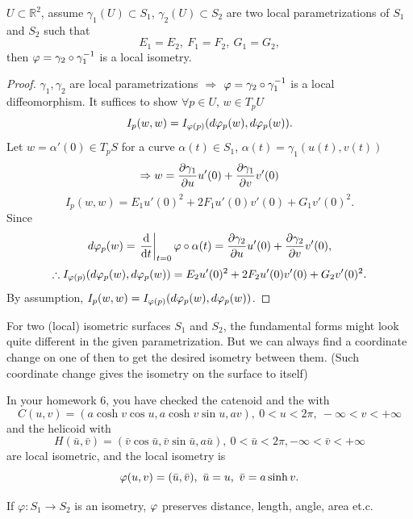 \begin{proposition}
    \(U\subset \mathbb{R}^2\), assume \(\gamma_1(U)\subset S_1\), 
    \(\gamma_2(U)\subset S_2\) are two local parametrizations 
    of \(S_1\) and \(S_2\) such that 
    \[
        E_1=E_2,~F_1=F_2,~G_1=G_2,    
    \]
    then \(\varphi=\gamma_2\circ \gamma_1^{-1}\) is a local isometry.
\end{proposition}
\begin{proof}
    \(\gamma_1,\gamma_2\) are local parametrizations \(\Rightarrow\)
    \(\varphi=\gamma_2\circ\gamma_1^{-1}\) is a local diffeomorphism. 
    It suffices to show \(\forall p\in U\), \(w\in T_p U\)
    \[
        I_p(w,w)=I_{\varphi(p)}(d\varphi_p(w),d\varphi_p(w)).    
    \]
    Let \(w=\alpha'(0)\in T_p S\) for a curve \(\alpha(t)\in S_1\),
     \(\alpha(t)=\gamma_1\left(u(t),v(t)\right)\) 
     \[\Rightarrow
     w=\pdv{\gamma_1}{u}u'(0)+\pdv{\gamma_1}{v}v'(0)\]
     \[
        I_p(w,w)=E_1u'(0)^2+2 F_1u'(0)v'(0)+G_1 v'(0)^2.   
     \]
     Since
     \[
        d\varphi_p(w)=\left.\dv{t}\right|_{t=0}\varphi\circ \alpha(t)
        =\pdv{\gamma_2}{u}u'(0)+\pdv{\gamma_2}{v}v'(0) ,
     \]
     \[
        \therefore I_{\varphi(p)}(d\varphi_p(w),d\varphi_p(w))=
        E_2 u'(0)^2+2 F_2 u'(0)v'(0)+G_2 v'(0)^2  .
     \]
    By assumption, \(I_p(w,w)=I_{\varphi(p)}(d\varphi_p(w),d\varphi_p(w))\).
\end{proof}
\begin{remark}
    For two (local) isometric surfaces \(S_1\) and \(S_2\), the 
     fundamental forms might look quite different 
    in the given parametrization. But we can always find a coordinate 
    change on one of then to get the desired isometry between them.
    (Such coordinate change gives the isometry on the surface to itself)
\end{remark}
\begin{exercise}
    In your homework 6, you have checked the catenoid and the with 
    \[
        C(u,v)=\left(a\cosh v\cos u,a\cosh v\sin u,a v\right),~
        0<u<2\pi,~-\infty<v<+\infty
    \]
    and the helicoid with 
    \[
        H(\bar{u},\bar{v})=\left(\bar{v}\cos\bar{u},
        \bar{v}\sin\bar{u},a \bar{u}\right),~0<\bar{u}<2\pi,-\infty<
        \bar{v}<+\infty
    \]
    are local isometric, and the local isometry is 
    \[
        \varphi(u,v)=(\bar{u},\bar{v}),~\bar{u}=u,~\bar{v}=a\sinh v.    
    \]
\end{exercise}
\begin{remark}
    If \(\varphi\colon S_1\to S_2\) is an isometry, \(\varphi\) preserves distance, 
    length, angle, area et.c.
\end{remark}
